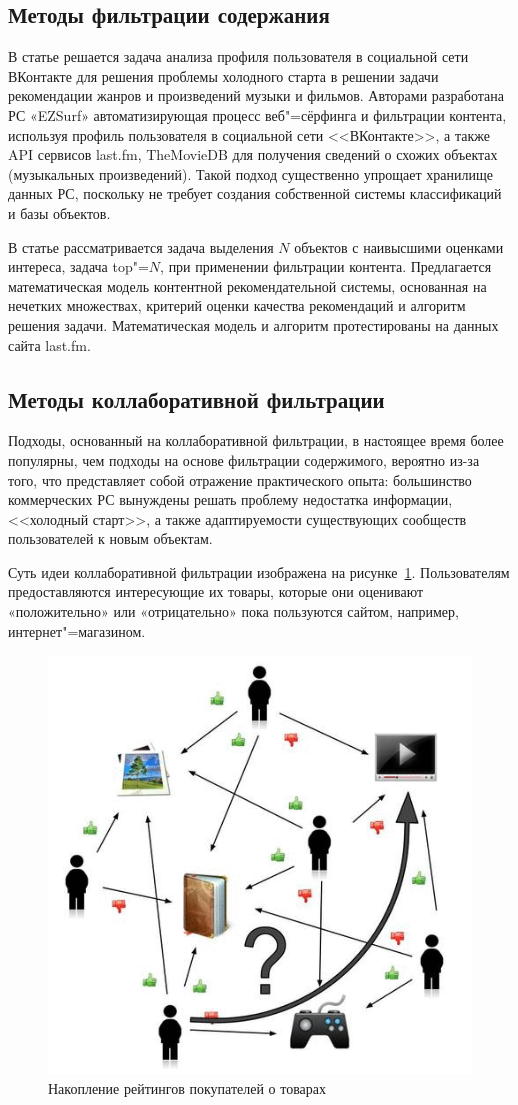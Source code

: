 \documentclass[a4paper,14pt,openany,final]{extreport} %
\def\oldcaption{} \let\oldcaption=\caption
\def\caption{\stepcounter{captionsnum}\oldcaption}
\begin{document}
\subsection{Методы фильтрации содержания}
\label{sec:content-filtering}

В статье \cite{b5} решается задача анализа профиля пользователя в социальной сети ВКонтакте для решения проблемы холодного старта в решении задачи рекомендации жанров и произведений музыки и фильмов. Авторами разработана РС «EZSurf» автоматизирующая процесс веб"=сёрфинга и фильтрации контента, используя профиль пользователя в социальной сети <<ВКонтакте>>, а также API сервисов last.fm, TheMovieDB для получения сведений о схожих объектах (музыкальных произведений). Такой подход существенно упрощает хранилище данных РС, поскольку не требует создания собственной системы классификаций и базы объектов.

В статье \cite{b9} рассматривается задача выделения $N$ объектов с наивысшими оценками интереса, задача top"=$N$, при применении фильтрации контента. Предлагается математическая модель контентной рекомендательной системы, основанная на нечетких множествах, критерий оценки качества рекомендаций и алгоритм решения задачи. Математическая модель и алгоритм протестированы на данных сайта last.fm.

\subsection{Методы коллаборативной фильтрации}
\label{sec:collab-filtering}

Подходы, основанный на коллаборативной фильтрации, в настоящее время более популярны, чем подходы на основе фильтрации содержимого, вероятно из-за того, что представляет собой отражение практического опыта: большинство коммерческих РС вынуждены решать проблему недостатка информации, <<холодный старт>>, а также адаптируемости существующих сообществ пользователей к новым объектам.

Суть идеи коллаборативной фильтрации изображена на рисунке~\ref{fig:collab-essence}. Пользователям предоставляются интересующие их товары, которые они оценивают «положительно» или «отрицательно» пока пользуются сайтом, например, интернет"=магазином.

\begin{figure}[htb]\centering
  \includegraphics[width=0.5\linewidth]{collab1.png}
\caption{Накопление рейтингов покупателей о товарах}
\label{fig:collab-essence}
\end{figure}
\end{document}

